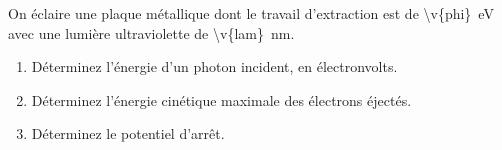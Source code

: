 On éclaire une plaque métallique dont le travail d'extraction est de \qty{\v{phi}}{eV} avec une lumière ultraviolette de \qty{\v{lam}}{nm}.

\begin{enumerate}[label=\alph*)]
    \item Déterminez l'énergie d'un photon incident, en électronvolts.
    \item Déterminez l'énergie cinétique maximale des électrons éjectés.
    \item Déterminez le potentiel d'arrêt.
\end{enumerate}
